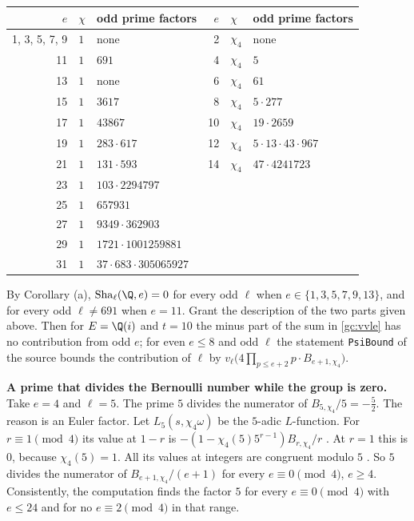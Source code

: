 \documentclass[11pt,letterpaper]{article}
\begin{document}
\begin{center}\small
\begin{tabular}{@{}rll@{\qquad}rll@{}}
\toprule
$e$ & $\chi$ & odd prime factors & $e$ & $\chi$ & odd prime factors\\
\midrule
1, 3, 5, 7, 9 & $1$ & none & 2 & $\chi_4$ & none\\
11 & $1$ & $691$ & 4 & $\chi_4$ & $5$\\
13 & $1$ & none & 6 & $\chi_4$ & $61$\\
15 & $1$ & $3617$ & 8 & $\chi_4$ & $5\cdot277$\\
17 & $1$ & $43867$ & 10 & $\chi_4$ & $19\cdot2659$\\
19 & $1$ & $283\cdot617$ & 12 & $\chi_4$ & $5\cdot13\cdot43\cdot967$\\
21 & $1$ & $131\cdot593$ & 14 & $\chi_4$ & $47\cdot4241723$\\
23 & $1$ & $103\cdot2294797$ &&&\\
25 & $1$ & $657931$ &&&\\
27 & $1$ & $9349\cdot362903$ &&&\\
29 & $1$ & $1721\cdot1001259881$ &&&\\
31 & $1$ & $37\cdot683\cdot305065927$ &&&\\
\bottomrule
\end{tabular}
\end{center}

By Corollary (a), $\mathrm{Sha}_\ell(\Q,e)=0$ for every odd $\ell$ when $e\in\{1,3,5,7,9,13\}$, and for
every odd $\ell\ne691$ when $e=11$. Grant the description of the two parts given above. Then for $E=\Q(i)$
and $t=10$ the minus part of the sum in \eqref{gc:vvle}
has no contribution from odd $e$; for even $e\le8$ and odd $\ell$ the statement \texttt{PsiBound} of the source
bounds the contribution of $\ell$ by $v_\ell\big(4\prod_{p\le e+2}p\cdot B_{e+1,\chi_4}\big)$.

\textbf{A prime that divides the Bernoulli number while the group is zero.} Take $e=4$ and $\ell=5$. The
prime $5$ divides the numerator of $B_{5,\chi_4}/5=-\frac52$. The reason is an Euler factor. Let
$L_5(s,\chi_4\omega)$ be the $5$-adic $L$-function. For $r\equiv1\pmod4$ its value at $1-r$ is
$-(1-\chi_4(5)5^{r-1})B_{r,\chi_4}/r$ \cite[Thm.~5.11]{Was82}. At $r=1$ this is $0$, because $\chi_4(5)=1$.
All its values at integers are congruent modulo $5$ \cite[Cor.~5.13]{Was82}. So $5$ divides the numerator of
$B_{e+1,\chi_4}/(e+1)$ for every $e\equiv0\pmod4$, $e\ge4$. Consistently, the computation finds the factor
$5$ for every $e\equiv0\pmod 4$ with $e\le24$ and for no $e\equiv2\pmod4$ in that range.
\end{document}
